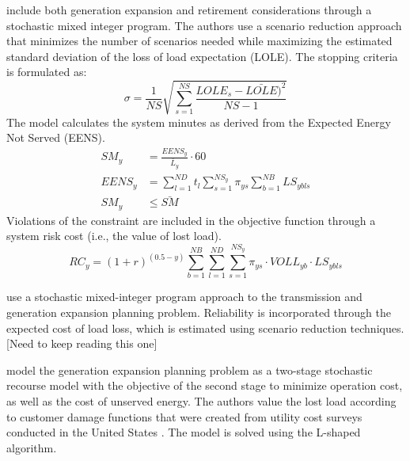 \documentclass[10pt]{amsart}
\begin{document}
\cite{tohidi2013generation} include both generation expansion and retirement considerations through a stochastic mixed integer program.
The authors use a scenario reduction approach that minimizes the number of scenarios needed while maximizing the estimated standard deviation of the loss of load expectation (LOLE). 
The stopping criteria is formulated as:
\begin{equation}
\sigma = \frac{1}{NS}\sqrt{\sum_{s=1}^{NS}\frac{LOLE_{s}-\bar{LOLE})^2}{NS-1}}
\end{equation}
The model calculates the system minutes as derived from the Expected Energy Not Served (EENS). 
\begin{equation}
\begin{split}
SM_{y} &= \frac{EENS_{y}}{\bar{L}_{y}}\cdot 60 \\
EENS_{y} &= \sum_{l=1}^{ND} t_{l} \sum_{s=1}^{NS_y} \pi_{ys} \sum_{b=1}^{NB} LS_{ybls} \\
SM_{y} &\leq \bar{SM}
\end{split}
\end{equation}
Violations of the constraint are included in the objective function through a system risk cost (i.e., the value of lost load).
\begin{equation}
RC_{y} = (1+r)^{(0.5-y)}\sum_{b=1}^{NB}\sum_{l=1}^{ND}\sum_{s=1}^{NS_y} \pi_{ys} \cdot VOLL_{yb} \cdot LS_{ybls}
\end{equation}

\cite{jirutitijaroen2008reliability} use a stochastic mixed-integer program approach to the transmission and generation expansion planning problem.
Reliability is incorporated through the expected cost of load loss, which is estimated using scenario reduction techniques.
[Need to keep reading this one] 

\cite{jirutitijaroen2007stochastic} model the generation expansion planning problem as a two-stage stochastic recourse model with the objective of the second stage to minimize operation cost, as well as the cost of unserved energy.
The authors value the lost load according to customer damage functions that were created from utility cost surveys conducted in the United States \parencite{lawton2003framework}. 
The model is solved using the L-shaped algorithm.

\printbibliography
\end{document}
